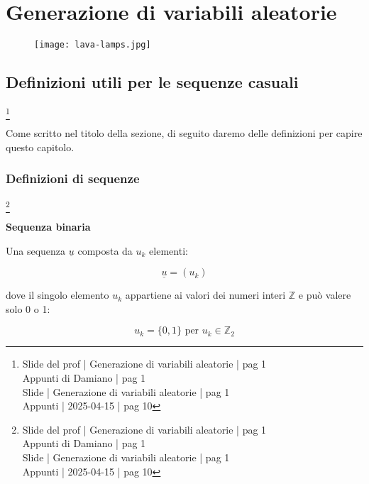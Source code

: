 \chapter{Generazione di variabili aleatorie}

\begin{figure}[h]
    \centering
    \texttt{[image: lava-lamps.jpg]}
\end{figure}

\newpage 

\section{Definizioni utili per le sequenze casuali}
\footnote{Slide del prof | Generazione di variabili aleatorie | pag 1 \\ 
Appunti di Damiano | pag 1 \\ 
Slide | Generazione di variabili aleatorie | pag  1\\ 
Appunti | 2025-04-15 | pag 10
} 

Come scritto nel titolo della sezione, 
di seguito daremo delle definizioni per capire questo capitolo. \newline 

\newpage 

\subsection{Definizioni di sequenze}
\footnote{Slide del prof | Generazione di variabili aleatorie | pag 1\\ 
Appunti di Damiano | pag 1\\ 
Slide | Generazione di variabili aleatorie | pag  1 \\ 
Appunti | 2025-04-15 | pag 10
} 

\textbf{Sequenza binaria} 

Una sequenza $\underline{u}$ composta da $u_k$ elementi: 

{
    \Large 
    \begin{equation}
        \underline{u} = (u_k)
    \end{equation}
}

dove il singolo elemento $u_k$ appartiene ai valori dei numeri interi $\mathbb{Z}$ e può valere solo 0 o 1: 

{
    \Large 
    \begin{equation}
        u_k = \{0, 1\} \text{ per } u_k \in \mathbb{Z}_2
    \end{equation}
}

